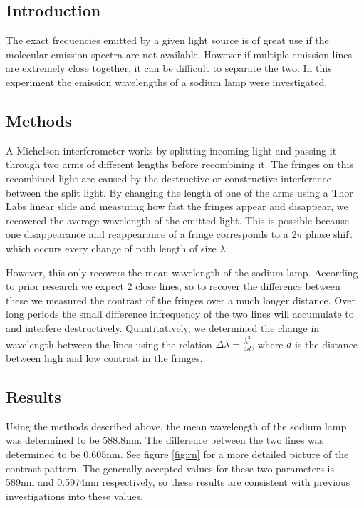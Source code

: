 \documentclass[letterpaper, reqno,11pt]{article}
\begin{document}
\subsection{Introduction}

The exact frequencies emitted by a given light source is of great use if the molecular emission spectra are not available. However if multiple emission lines are extremely close together, it can be difficult to separate the two. In this experiment the emission wavelengths of a sodium lamp were investigated.

\subsection{Methods}

A Michelson interferometer works by splitting incoming light and passing it through two arms of different lengths before recombining it. The fringes on this recombined light are caused by the destructive or constructive interference between the split light. By changing the length of one of the arms using a Thor Labs linear slide and measuring how fast the fringes appear and disappear, we recovered the average wavelength of the emitted light. This is possible because one disappearance and reappearance of a fringe corresponds to a $2\pi$ phase shift which occurs every change of path length of size $\lambda$.

However, this only recovers the mean wavelength of the sodium lamp. According to prior research we expect 2 close lines, so to recover the difference between these we measured the contrast of the fringes over a much longer distance. Over long periods the small difference infrequency of the two lines will accumulate to and interfere destructively. Quantitatively, we determined the change in wavelength between the lines using the relation $\Delta\lambda= \frac{\bar\lambda^2}{4d}$, where $d$ is the distance between high and low contrast in the fringes.

\subsection{Results}

Using the methods described above, the mean wavelength of the sodium lamp was determined to be $588.8$nm. The difference between the two lines was determined to be 0.605nm. See figure \ref{fig:rn} for a more detailed picture of the contrast pattern. The generally accepted values for these two parameters is 589nm and 0.5974nm respectively, so these results are consistent with previous investigations into these values.
\end{document}
